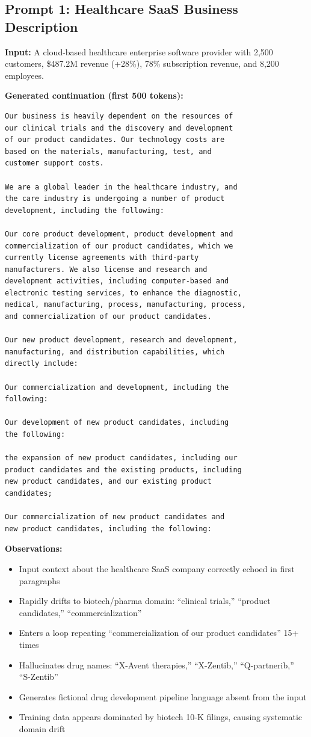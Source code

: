\documentclass[12pt]{article}
\begin{document}
\subsection{Prompt 1: Healthcare SaaS Business Description}

\textbf{Input:} A cloud-based healthcare enterprise software provider with 2,500 customers, \$487.2M revenue (+28\%), 78\% subscription revenue, and 8,200 employees.

\textbf{Generated continuation (first 500 tokens):}

\begin{Verbatim}[fontsize=\small]
Our business is heavily dependent on the resources of
our clinical trials and the discovery and development
of our product candidates. Our technology costs are
based on the materials, manufacturing, test, and
customer support costs.

We are a global leader in the healthcare industry, and
the care industry is undergoing a number of product
development, including the following:

Our core product development, product development and
commercialization of our product candidates, which we
currently license agreements with third-party
manufacturers. We also license and research and
development activities, including computer-based and
electronic testing services, to enhance the diagnostic,
medical, manufacturing, process, manufacturing, process,
and commercialization of our product candidates.

Our new product development, research and development,
manufacturing, and distribution capabilities, which
directly include:

Our commercialization and development, including the
following:

Our development of new product candidates, including
the following:

the expansion of new product candidates, including our
product candidates and the existing products, including
new product candidates, and our existing product
candidates;

Our commercialization of new product candidates and
new product candidates, including the following:
\end{Verbatim}

\textbf{Observations:}
\begin{itemize}
    \item Input context about the healthcare SaaS company correctly echoed in first paragraphs
    \item Rapidly drifts to biotech/pharma domain: ``clinical trials,'' ``product candidates,'' ``commercialization''
    \item Enters a loop repeating ``commercialization of our product candidates'' 15+ times
    \item Hallucinates drug names: ``X-Avent therapies,'' ``X-Zentib,'' ``Q-partnerib,'' ``S-Zentib''
    \item Generates fictional drug development pipeline language absent from the input
    \item Training data appears dominated by biotech 10-K filings, causing systematic domain drift
\end{itemize}
\end{document}
